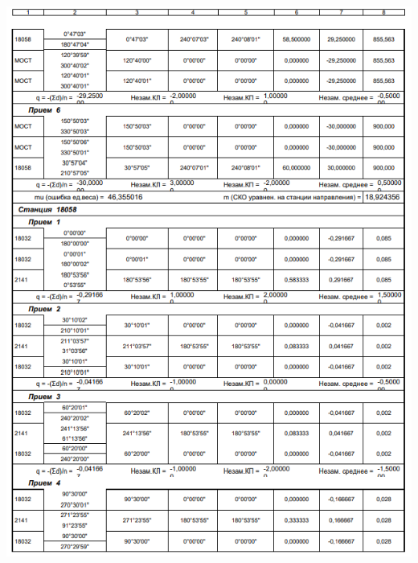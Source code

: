 \documentclass[a4paper]{article}
\begin{document}
\begin{newpage}
\begin{center}
        \includegraphics[scale=1.4]{vedomosty/скп11.png}

\end{center}
\end{newpage}
\end{document}
